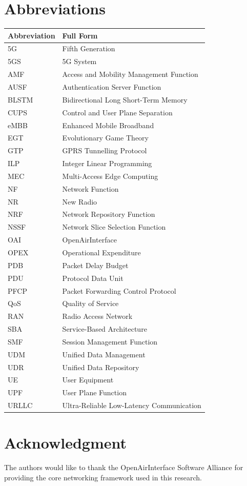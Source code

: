 \documentclass[conference]{IEEEtran}
\begin{document}
\section*{Abbreviations}
\begin{center}
\renewcommand{\arraystretch}{1.1}
\begin{tabular}{ll}
\hline
\textbf{Abbreviation} & \textbf{Full Form} \\
\hline
5G      & Fifth Generation \\
5GS     & 5G System \\
AMF     & Access and Mobility Management Function \\
AUSF    & Authentication Server Function \\
BLSTM   & Bidirectional Long Short-Term Memory \\
CUPS    & Control and User Plane Separation \\
eMBB    & Enhanced Mobile Broadband \\
EGT     & Evolutionary Game Theory \\
GTP     & GPRS Tunnelling Protocol \\
ILP     & Integer Linear Programming \\
MEC     & Multi-Access Edge Computing \\
NF      & Network Function \\
NR      & New Radio \\
NRF     & Network Repository Function \\
NSSF    & Network Slice Selection Function \\
OAI     & OpenAirInterface \\
OPEX    & Operational Expenditure \\
PDB     & Packet Delay Budget \\
PDU     & Protocol Data Unit \\
PFCP    & Packet Forwarding Control Protocol \\
QoS     & Quality of Service \\
RAN     & Radio Access Network \\
SBA     & Service-Based Architecture \\
SMF     & Session Management Function \\
UDM     & Unified Data Management \\
UDR     & Unified Data Repository \\
UE      & User Equipment \\
UPF     & User Plane Function \\
URLLC   & Ultra-Reliable Low-Latency Communication \\
\hline
\end{tabular}
\end{center}

\section*{Acknowledgment}
The authors would like to thank the OpenAirInterface Software
Alliance for providing the core networking framework used in
this research.



\end{document}
